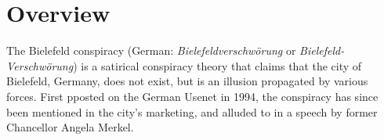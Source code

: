 \section{Overview}
The Bielefeld conspiracy (German: \textit{Bielefeldverschwörung} or \textit{Bielefeld-Verschwörung}) is a satirical conspiracy  theory that claims that the city of Bielefeld, Germany, does not exist, but is an illusion propagated by various forces. 
First pposted on the German Usenet in 1994, the conspiracy has since been mentioned in the city's marketing, and alluded to in a speech by former Chancellor Angela Merkel.

